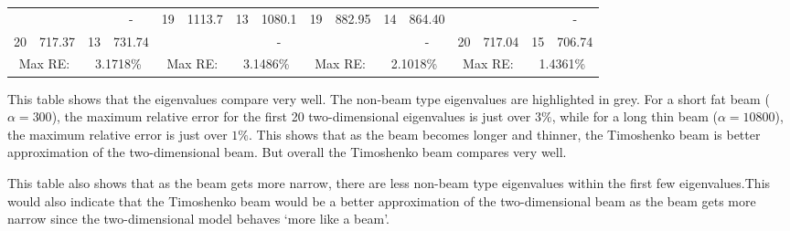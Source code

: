\documentclass[../../main.tex]{subfiles}
\begin{document}
\begin{table}[h!]
{{\begin{tabular}{|cccc||cccc||cccc||cccc|}
		\cellcolor{lightgray}{19} & \cellcolor{lightgray}{657.87} &       & {-} & 19    & 1113.7 & 13    & 1080.1 & 19    & 882.95 & 14    & 864.40 & \cellcolor{lightgray}{19}    & \cellcolor{lightgray}{623.05} &       & {-} \\
		{20} & 717.37 & 13    & 731.74 & \cellcolor{lightgray}{20}    & \cellcolor{lightgray}{1218.0}  &       & {-} & \cellcolor{lightgray}{20}    & \cellcolor{lightgray}{927.18} &       & {-} & 20    & 717.04 & 15    & 706.74 \\
		\hline
		\multicolumn{2}{|c}{Max RE:} & \multicolumn{2}{c||}{3.1718\%} & \multicolumn{2}{c}{Max RE:} & \multicolumn{2}{c||}{3.1486\%} & \multicolumn{2}{c}{Max RE:} & \multicolumn{2}{c||}{2.1018\%} & \multicolumn{2}{c}{Max RE:} & \multicolumn{2}{c|}{1.4361\%} \\
		\hline
	\end{tabular}%
	\label{tab:Timo_chapter6}%
}
}
\end{table}%
\FloatBarrier

This table shows that the eigenvalues compare very well. The non-beam type eigenvalues are highlighted in grey. For a short fat beam ($\alpha = 300$), the maximum relative error for the first 20 two-dimensional eigenvalues is just over $3\%$, while for a long thin beam ($\alpha = 10800$), the maximum relative error is just over $1\%$. This shows that as the beam becomes longer and thinner, the Timoshenko beam is better approximation of the two-dimensional beam. But overall the Timoshenko beam compares very well.

This table also shows that as the beam gets more narrow, there are less non-beam type eigenvalues within the first few eigenvalues.This would also indicate that the Timoshenko beam would be a better approximation of the two-dimensional beam as the beam gets more narrow since the two-dimensional model behaves `more like a beam'.
\end{document}

